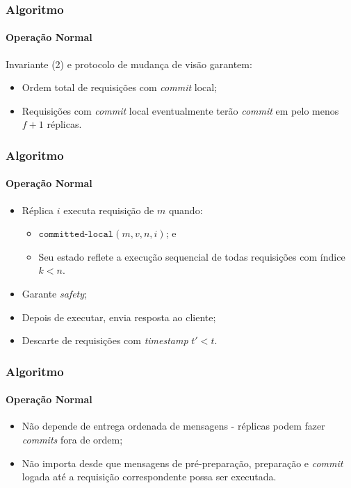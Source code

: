 \documentclass{beamer}
\begin{document}
\begin{frame}
  \frametitle{Algoritmo}
  \framesubtitle{Operação Normal}

  Invariante (2) e protocolo de mudança de visão garantem:
  \begin{itemize}
    \item
      Ordem total de requisições com \textit{commit} local;

    \item
      Requisições com \textit{commit} local eventualmente terão \textit{commit} em pelo menos $f + 1$ réplicas.
  \end{itemize}
\end{frame}

\begin{frame}
  \frametitle{Algoritmo}
  \framesubtitle{Operação Normal}

  \begin{itemize}
    \item
      Réplica $i$ executa requisição de $m$ quando:
      \begin{itemize}
        \item
          $\texttt{committed-local}(m, v, n, i)$; e
          
        \item
          Seu estado reflete a execução sequencial de todas requisições com índice $k < n$.
      \end{itemize}

    \item
      Garante \textit{safety};

    \item
      Depois de executar, envia resposta ao cliente;

    \item
      Descarte de requisições com \textit{timestamp} $t' < t$.
  \end{itemize}
\end{frame}

\begin{frame}
  \frametitle{Algoritmo}
  \framesubtitle{Operação Normal}
  
  \begin{itemize}
    \item
      Não depende de entrega ordenada de mensagens - réplicas podem fazer \textit{commits} fora de ordem;

    \item
      Não importa desde que mensagens de pré-preparação, preparação e \textit{commit} logada até a requisição correspondente possa ser executada.
  \end{itemize}
\end{frame}
\end{document}
